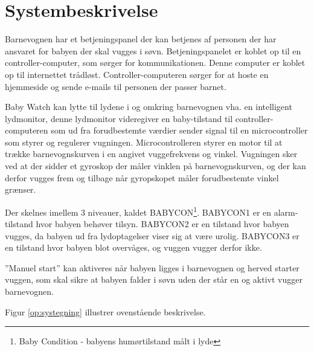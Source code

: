 \chapter{Systembeskrivelse}

Barnevognen har et betjeningspanel der kan betjenes af personen der har ansvaret for babyen der skal vugges i søvn. Betjeningspanelet er koblet op til en controller-computer, som sørger for kommunikationen. Denne computer er koblet op til internettet trådløst. Controller-computeren sørger for at hoste en hjemmeside og sende e-mails til personen der passer barnet.

Baby Watch kan lytte til lydene i og omkring barnevognen vha. en intelligent lydmonitor, denne lydmonitor videregiver en baby-tilstand til controller-computeren som ud fra forudbestemte værdier sender signal til en microcontroller som styrer og regulerer vugningen. Microcontrolleren styrer en motor til at trække barnevognskurven i en angivet vuggefrekvens og vinkel. Vugningen sker ved at der sidder et gyroskop der måler vinklen på barnevognskurven, og der kan derfor vugges frem og tilbage når gyropskopet måler forudbestemte vinkel grænser.

Der skelnes imellem 3 niveauer, kaldet BABYCON\footnote{Baby Condition - babyens humørtilstand målt i lyde}. BABYCON1 er en alarm-tilstand hvor babyen behøver tilsyn. BABYCON2 er en tilstand hvor babyen vugges, da babyen ud fra lydoptagelser viser sig at være urolig. BABYCON3 er en tilstand hvor babyen blot overvåges, og vuggen vugger derfor ikke. 

''Manuel start'' kan aktiveres når babyen ligges i barnevognen og herved starter vuggen, som skal sikre at babyen falder i søvn uden der står en og aktivt vugger barnevognen. 

Figur \ref{op:systegning} illustrer ovenstående beskrivelse. 

